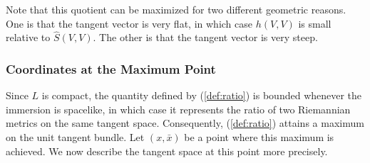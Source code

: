 \documentclass[12pt,letterpaper]{amsart}%
\numberwithin{mycounter}{section}
\theoremstyle{plain}
\numberwithin{equation}{section}
\theoremstyle{definition}
\begin{document}
Note that this quotient can be maximized for two different geometric reasons.  
One is that the tangent vector is very flat, in which case $h(V,V)$ is small 
relative to $\hat{S}(V,V)$.  
The other is that the tangent vector is very steep.



\subsubsection{Coordinates at the Maximum Point}

Since $L$ is compact, the quantity defined by (\ref{def:ratio}) is bounded whenever the immersion is spacelike, in which case it represents the ratio of two Riemannian metrics on the same tangent space. Consequently, (\ref{def:ratio}) attains a maximum on the unit tangent bundle. Let $\left( x,\bar{x}\right) $ be a point where this maximum is achieved.
We now describe the tangent space at this point more precisely.
\end{document}
